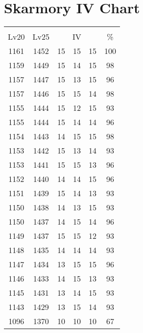 \documentclass{article}%
\begin{document}
%
\normalsize%
\section{Skarmory IV Chart}%
\label{sec:Skarmory IV Chart}%
\renewcommand{\arraystretch}{1.5}%
\begin{tabular}{|c|c|c|c|c|c|}%
\hline%
\multicolumn{6}{|c|}{\textcolor{white}{ 
\linebreak{Skarmory}
}%
\cellcolor{black}}\\%
\multicolumn{1}{|c}{Lv20}&\multicolumn{1}{c|}{Lv25}&\multicolumn{3}{c|}{IV}&\multicolumn{1}{|c|}{\%}\\%
\hline%
\rowcolor{color100}%
1161&1452&15&15&15&100\\%
\hline%
\rowcolor{color98}%
1159&1449&15&14&15&98\\%
\hline%
\rowcolor{color96}%
1157&1447&15&13&15&96\\%
\hline%
\rowcolor{color98}%
1157&1446&15&15&14&98\\%
\hline%
\rowcolor{color93}%
1155&1444&15&12&15&93\\%
\hline%
\rowcolor{color96}%
1155&1444&15&14&14&96\\%
\hline%
\rowcolor{color98}%
1154&1443&14&15&15&98\\%
\hline%
\rowcolor{color93}%
1153&1442&15&13&14&93\\%
\hline%
\rowcolor{color96}%
1153&1441&15&15&13&96\\%
\hline%
\rowcolor{color96}%
1152&1440&14&14&15&96\\%
\hline%
\rowcolor{color93}%
1151&1439&15&14&13&93\\%
\hline%
\rowcolor{color93}%
1150&1438&14&13&15&93\\%
\hline%
\rowcolor{color96}%
1150&1437&14&15&14&96\\%
\hline%
\rowcolor{color93}%
1149&1437&15&15&12&93\\%
\hline%
\rowcolor{color93}%
1148&1435&14&14&14&93\\%
\hline%
\rowcolor{color96}%
1147&1434&13&15&15&96\\%
\hline%
\rowcolor{color93}%
1146&1433&14&15&13&93\\%
\hline%
\rowcolor{color93}%
1145&1431&13&14&15&93\\%
\hline%
\rowcolor{color93}%
1143&1429&13&15&14&93\\%
\hline%
\rowcolor{color91}%
1096&1370&10&10&10&67\\%
\end{tabular}

%
\end{document}
